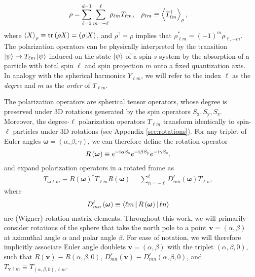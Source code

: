 \documentclass[notitlepage,twocolumn]{revtex4-2}
\newcommand{\p}[1]{\left(#1\right)} %
\newcommand{\bk}{\Braket} %
\renewcommand{\v}{\bm} %
\renewcommand{\i}{\mathrm{i}\mkern1mu} %
\newcommand{\x}{\text{x}}
\newcommand{\y}{\text{y}}
\newcommand{\z}{\text{z}}
\def\obk#1{\mathinner{({#1})}}
\begin{document}
\begin{align}
  \rho = \sum_{\ell=0}^{d-1} \sum_{m=-\ell}^\ell
  \rho_{\ell m} T_{\ell m},
  &&
  \rho_{\ell m} \equiv \bk{T_{\ell m}^\dag}_\rho,
  \label{eq:trans_state}
\end{align}
where $\bk{X}_\rho\equiv\tr\p{\rho X}=\obk{\rho|X}$, and $\rho^\dag=\rho$ implies that $\rho_{\ell m}^*=\p{-1}^m\rho_{\ell,-m}$.
The polarization operators can be physically interpreted by the transition $\ket\psi\to T_{\ell m}\ket\psi$ induced on the state $\ket\psi$ of a spin-$s$ system by the absorption of a particle with total spin $\ell$ and spin projection $m$ onto a fixed quantization axis.
In analogy with the spherical harmonics $Y_{\ell m}$, we will refer to the index $\ell$ as the {\it degree} and $m$ as the {\it order} of $T_{\ell m}$.

The polarization operators are spherical tensor operators, whose degree is preserved under 3D rotations generated by the spin operators $S_\x,S_\y,S_\z$.
Moreover, the degree-$\ell$ polarization operators $T_{\ell m}$ transform identically to spin-$\ell$ particles under 3D rotations (see Appendix \ref{sec:rotations}).
For any triplet of Euler angles $\v\omega=\p{\alpha,\beta,\gamma}$, we can therefore define the rotation operator
\begin{align}
  R\p{\v\omega} \equiv e^{-\i\alpha S_\z} e^{-\i\beta S_\y} e^{-\i\gamma S_\z},
\end{align}
and expand polarization operators in a rotated frame as
\begin{align}
  T_{\v\omega\ell m} \equiv
  R\p{\v\omega}^\dag T_{\ell m} R\p{\v\omega}
  = \sum_{n=-\ell}^\ell D_{nm}^\ell\p{\v\omega} T_{\ell n},
  \label{eq:trans_rot}
\end{align}
where
\begin{align}
  D_{mn}^\ell\p{\v\omega} \equiv \bk{\ell m|R\p{\v\omega}|\ell n}
\end{align}
are (Wigner) rotation matrix elements.
Throughout this work, we will primarily consider rotations of the sphere that take the north pole to a point $\v v=\p{\alpha,\beta}$ at azimuthal angle $\alpha$ and polar angle $\beta$.
For ease of notation, we will therefore implicitly associate Euler angle doublets $\v v=\p{\alpha,\beta}$ with the triplet $\p{\alpha,\beta,0}$, such that $R\p{\v v} \equiv R\p{\alpha,\beta,0}$, $D^\ell_{mn}\p{\v v} \equiv D^\ell_{mn}\p{\alpha,\beta,0}$, and $T_{\v v\ell m} \equiv T_{\p{\alpha,\beta,0},\ell m}$.
\end{document}
